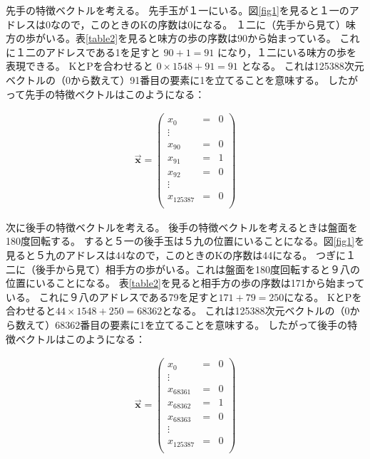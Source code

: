 \documentclass[11pt,a4paper]{ltjsarticle}
\begin{document}
先手の特徴ベクトルを考える。
先手玉が１一にいる。図\ref{fig1}を見ると１一のアドレスは0なので，このときのKの序数は0になる。
１二に（先手から見て）味方の歩がいる。表\ref{table2}を見ると味方の歩の序数は90から始まっている。
これに１二のアドレスである1を足すと $90 + 1 = 91$ になり，１二にいる味方の歩を表現できる。
KとPを合わせると $0 \times 1548 + 91 = 91$ となる。
これは125388次元ベクトルの（0から数えて）91番目の要素に1を立てることを意味する。
したがって先手の特徴ベクトルはこのようになる：

\begin{eqnarray*}
    \vec{\bm{x}}
    =
    \begin{pmatrix}
        x_{0}  &=& 0 \\
        \vdots       \\
        x_{90} &=& 0 \\
        x_{91} &=& 1 \\
        x_{92} &=& 0 \\
        \vdots       \\
        x_{125387} &=& 0 \\
    \end{pmatrix}
\end{eqnarray*}

次に後手の特徴ベクトルを考える。
後手の特徴ベクトルを考えるときは盤面を180度回転する。
すると５一の後手玉は５九の位置にいることになる。図\ref{fig1}を見ると５九のアドレスは44なので，このときのKの序数は44になる。
つぎに１二に（後手から見て）相手方の歩がいる。これは盤面を180度回転すると９八の位置にいることになる。
表\ref{table2}を見ると相手方の歩の序数は171から始まっている。
これに９八のアドレスである79を足すと$171 + 79 = 250$になる。
KとPを合わせると$44 \times 1548 + 250 = 68362$となる。
これは125388次元ベクトルの（0から数えて）68362番目の要素に1を立てることを意味する。
したがって後手の特徴ベクトルはこのようになる：

\nopagebreak
\begin{eqnarray*}
    \vec{\bm{x}}
    =
    \begin{pmatrix}
        x_{0}  &=& 0 \\
        \vdots       \\
        x_{68361} &=& 0 \\
        x_{68362} &=& 1 \\
        x_{68363} &=& 0 \\
        \vdots       \\
        x_{125387} &=& 0 \\
    \end{pmatrix}
\end{eqnarray*}
\end{document}
